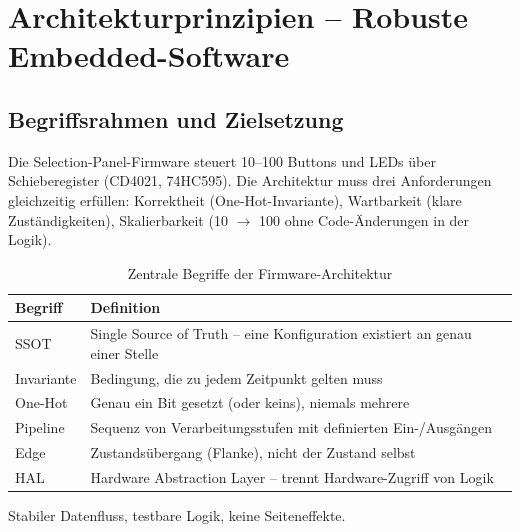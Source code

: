 
\section{Architekturprinzipien -- Robuste Embedded-Software}
\label{sec:architekturprinzipien}

\subsection{Begriffsrahmen und Zielsetzung}
\label{subsec:arch-begriffsrahmen}

Die Selection-Panel-Firmware steuert 10--100 Buttons und LEDs über Schieberegister
(CD4021, 74HC595). Die Architektur muss drei Anforderungen gleichzeitig erfüllen:
Korrektheit (One-Hot-Invariante), Wartbarkeit (klare Zuständigkeiten), Skalierbarkeit
(10 $\to$ 100 ohne Code-Änderungen in der Logik).

\begin{table}[H]
\centering
\caption{Zentrale Begriffe der Firmware-Architektur}
\label{tab:arch-begriffe}
\begin{tabularx}{\textwidth}{@{}l X@{}}
\toprule
\textbf{Begriff} & \textbf{Definition} \\
\midrule
SSOT       & Single Source of Truth -- eine Konfiguration existiert an genau einer Stelle \\
Invariante & Bedingung, die zu jedem Zeitpunkt gelten muss \\
One-Hot    & Genau ein Bit gesetzt (oder keins), niemals mehrere \\
Pipeline   & Sequenz von Verarbeitungsstufen mit definierten Ein-/Ausgängen \\
Edge       & Zustandsübergang (Flanke), nicht der Zustand selbst \\
HAL        & Hardware Abstraction Layer -- trennt Hardware-Zugriff von Logik \\
\bottomrule
\end{tabularx}
\end{table}

\begin{tipbox}[Ziel]
Stabiler Datenfluss, testbare Logik, keine Seiteneffekte.
\end{tipbox}

